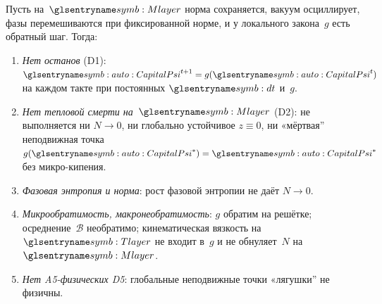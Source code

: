 \begin{theorem}
\label{thm:main-23}
Пусть на~$\Mlayer$ норма сохраняется, вакуум осциллирует,
фазы перемешиваются при фиксированной норме, и у локального закона~$g$ есть обратный шаг.
Тогда:
\begin{enumerate}[label=(\roman*)]
\item \emph{Нет останов} (D1): $\symCapitalPsi^{t+1}=g(\symCapitalPsi^t)$ на каждом такте при постоянных $\htick$ и~$g$.
\item \emph{Нет тепловой смерти на~$\Mlayer$} (D2): не выполняется ни $N\to 0$,
      ни глобально устойчивое $z\equiv 0$,
      ни «мёртвая'' неподвижная точка $g(\symCapitalPsi^*)=\symCapitalPsi^*$ без микро-кипения.
\item \emph{Фазовая энтропия и норма}: рост фазовой энтропии не даёт $N\to 0$.
\item \emph{Микрообратимость, макронеобратимость}: $g$ обратим на решётке;
      осреднение~$\mathcal{B}$ необратимо; кинематическая вязкость на~$\Tlayer$ не входит в~$g$
      и не обнуляет~$N$ на~$\Mlayer$.
\item \emph{Нет A5-физических D5}: глобальные неподвижные точки «лягушки'' не физичны.
\end{enumerate}
\end{theorem}

